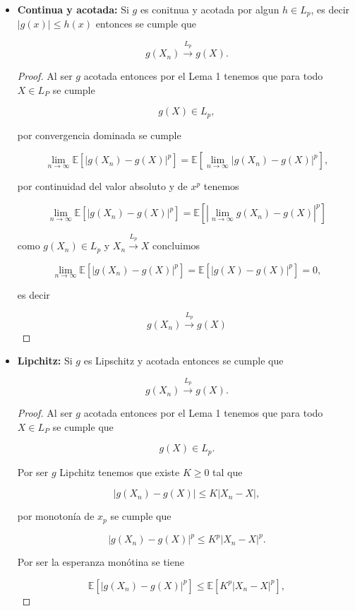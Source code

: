 \documentclass[letterpaper]{article}
\theoremstyle{definition}
\theoremstyle{lemathm}
\theoremstyle{lemademthm}
\newcommand{\limninf}{\lim_{n\to\infty}}
\newcommand{\abs}[1]{\left| #1 \right| }
\newcommand{\bracs}[1]{\left[ #1 \right] }
\newcommand{\1}{\mathbbm{1}}
\begin{document}
\begin{enumerate}
\begin{itemize}
			\item \textbf{Continua y acotada:} Si $g$ es conitnua y acotada por algun $h \in L_p$, es decir $|g(x)| \leq h(x)$ entonces se cumple que
			
			\[g(X_n) \xrightarrow{L_p}g(X).\]

			\begin{proof}

				Al ser $g$ acotada entonces por el Lema 1 tenemos que para todo $X \in L_P$ se cumple

				\[g(X) \in L_p,\]
				
				por convergencia dominada se cumple

				\[\limninf \mathbb{E}\bracs{\abs{g(X_n)-g(X)}^p} = \mathbb{E}\bracs{\limninf\abs{g(X_n)-g(X)}^p},\]

				por continuidad del valor absoluto y de $x^p$ tenemos

				\[\limninf \mathbb{E}\bracs{\abs{g(X_n)-g(X)}^p} = \mathbb{E}\bracs{\abs{\limninf g(X_n)- g(X)}^p}\]
				
				como $g(X_n) \in L_p$ y $X_n \xrightarrow{L_p} X$ concluimos

				\[\limninf \mathbb{E}\bracs{\abs{g(X_n)-g(X)}^p} = \mathbb{E}\bracs{\abs{g(X)-g(X)}^p} = 0,\]

				es decir

				\[g(X_n) \xrightarrow{L_p} g(X)\]

			\end{proof}

			\newpage

			\item \textbf{Lipchitz:} Si $g$ es Lipschitz y acotada  entonces se cumple que
			
			\[g(X_n) \xrightarrow{L_p} g(X).\]

			\begin{proof}

				Al ser $g$ acotada entonces por el Lema 1 tenemos que para todo $X \in L_P$ se cumple que

				\[g(X) \in L_p.\]

				Por ser $g$ Lipchitz tenemos que existe $K \geq 0$ tal que 

				\[|g(X_n)-g(X)| \leq K|X_n-X|,\]

				por monotonía de $x_p$ se cumple que

				\[|g(X_n)-g(X)|^p \leq K^p|X_n-X|^p.\]

				Por ser la esperanza monótina se tiene

				\[\mathbb{E}\bracs{|g(X_n)-g(X)|^p} \leq \mathbb{E}\bracs{K^p|X_n-X|^p},\]


\end{proof}
\end{itemize}
\end{enumerate}
\end{document}
